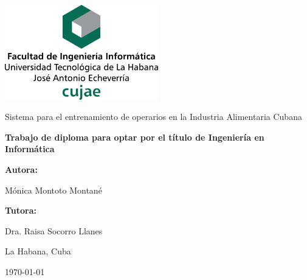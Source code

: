 \begin{titlepage}

\centering

{\includegraphics[width=0.5\textwidth]{imagen/cujae}\par}

\vspace{3.5cm}

{\LARGE Sistema para el entrenamiento de operarios en la Industria Alimentaria Cubana\par}
\vspace{1cm}

{\bfseries\Large Trabajo de diploma para optar por el título de Ingeniería en Informática\par}
\vspace{3.5cm}

{\bfseries\Large Autora:} { \Large Mónica Montoto Montané \par}
{\bfseries\Large Tutora: }{\Large Dra. Raisa Socorro Llanes \par}
\vfill

{\Large La Habana, Cuba \par}

\large{\mifecha\today}

\end{titlepage}


